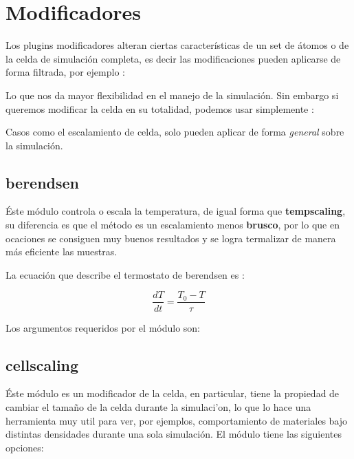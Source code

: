 \section{Modificadores}

Los plugins modificadores alteran ciertas caracter\'isticas de un set de \'atomos o de la celda de simulaci\'on completa, es decir las modificaciones pueden aplicarse de forma filtrada, por ejemplo :


Lo que nos da mayor flexibilidad en el manejo de la simulaci\'on. Sin embargo si queremos modificar la celda en su totalidad, podemos usar simplemente :


Casos como el escalamiento de celda, solo pueden aplicar de forma \textit{general} sobre la simulaci\'on.

\subsection{berendsen}
\'Este m\'odulo controla o escala la temperatura, de igual forma que \textbf{tempscaling}, su diferencia es que el m\'etodo es un escalamiento menos \textbf{brusco}, por lo que en ocaciones se consiguen muy buenos resultados y se logra termalizar de manera m\'as eficiente las muestras. 

La ecuaci\'on que describe el termostato de berendsen es :

$$\frac{dT}{dt} = \frac{T_0 - T}{\tau}$$

Los argumentos requeridos por el m\'odulo son:


\subsection{cellscaling}
\'Este m\'odulo es un modificador de la celda, en particular, tiene la propiedad de cambiar el tama\~no de la celda durante la simulaci'on, lo que lo hace una herramienta muy util para ver, por ejemplos, comportamiento de materiales bajo distintas densidades durante una sola simulaci\'on. El m\'odulo tiene las siguientes opciones:

